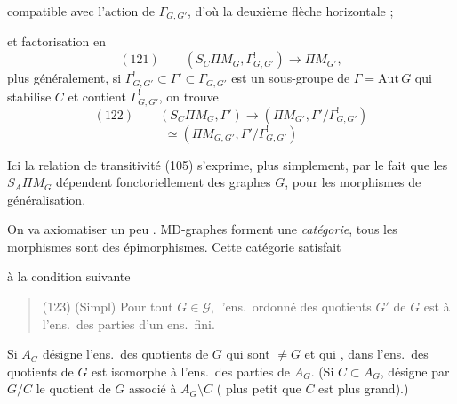 \documentclass[11pt,a4paper]{article}
\begin{document}

compatible avec l'action de $\Gamma_{G,G'}$, d'où \struck{\ill{}} la deuxième flèche horizontale ;  \ill{}

et factorisation en
\[
(121)\qquad (S_{C}\Pi M_{G},\Gamma^{!}_{G,G'}) \longrightarrow \Pi M_{G'} ,
\]
 plus généralement, si $\Gamma^{!}_{G,G'} \subset \Gamma' \subset \Gamma_{G,G'}$ est un sous-groupe de $\Gamma = \mathrm{Aut}\, G$ qui stabilise $C$ et contient $\Gamma^{!}_{G,G'}$, on trouve
\[
(122)\qquad (S_{C}\Pi M_{G},\Gamma') \longrightarrow (\Pi M_{G'},\Gamma'/\Gamma^{!}_{G,G'})
\]
\[
\simeq (\Pi M_{G,G'},\Gamma'/\Gamma^{!}_{G,G'})
\]

Ici la relation de transitivité (105)  s'exprime, plus simplement, par le fait que les  $S_{A}\Pi M_{G}$ dépendent fonctoriellement des graphes $G$, pour les morphismes de généralisation.

On va axiomatiser un peu .  MD-graphes  forment une \emph{catégorie},  tous les morphismes sont des épimorphismes. Cette catégorie satisfait

à la condition suivante
\begin{quote}
(123) (Simpl) Pour tout $G \in \mathcal{G}$, l'ens.\ ordonné des quotients $G'$ de $G$ est \struck{\ill{}}  \struck{\ill{}} à l'ens.\ des parties d'un ens.\ fini.
\end{quote}
Si $A_{G}$ désigne l'ens.\ des quotients  \struck{\ill{}} de $G$ qui sont $\neq G$ et qui   \ill{}, dans l'ens.\ des quotients de $G$ est  isomorphe à l'ens.\ des parties de $A_{G}$. (Si $C \subset A_{G}$, \ill{} désigne par $G/C$ le quotient de $G$ associé à $A_{G} \setminus C$ ( plus petit que $C$ est plus grand).)
\end{document}

